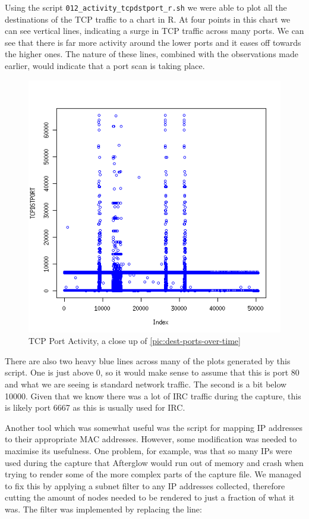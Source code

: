 \documentclass[a4paper,
    11pt,
    normalheadings,
    parindent,
    UKenglish,
    abstracton,
    ]{scrartcl}
\begin{document}
Using the script \texttt{012\_activity\_tcpdstport\_r.sh} we were able to plot all the destinations of the TCP traffic to a chart in R.
At four points in this chart we can see vertical lines, indicating a surge in TCP traffic across many ports.
We can see that there is far more activity around the lower ports and it eases off towards the higher ones.
The nature of these lines, combined with the observations made earlier, would indicate that a port scan is taking place.

\begin{figure}
    \begin{center}\includegraphics[width=\textwidth]{bin/09_tcp_r.png}\end{center}
    \caption{TCP Port Activity, a close up of \autoref{pic:dest-ports-over-time}}
    \label{pic:tcp_r}
\end{figure}

There are also two heavy blue lines across many of the plots generated by this script.
One is just above 0, so it would make sense to assume that this is port 80 and what we are seeing is standard network traffic.
The second is a bit below 10000.
Given that we know there was a lot of IRC traffic during the capture, this is likely port 6667 as this is usually used for IRC.

Another tool which was somewhat useful was the script for mapping IP addresses to their appropriate MAC addresses.
However, some modification was needed to maximise its usefulness.
One problem, for example, was that so many IPs were used during the capture that Afterglow would run out of memory and crash when trying to render some of the more complex parts of the capture file.
We managed to fix this by applying a subnet filter to any IP addresses collected, therefore cutting the amount of nodes needed to be rendered to just a fraction of what it was. The filter was implemented by replacing the line:
\end{document}
